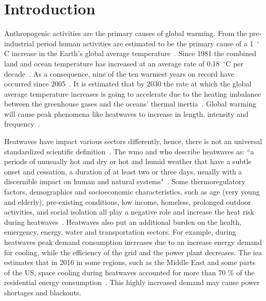 
\section{Introduction}\label{sec:introduction}

Anthropogenic activities are the primary causes of global warming.
From the pre-industrial period human activities are estimated to be the primary cause of a 1~$^{\circ}$C increase in the Earth's global average temperature~\cite{GlobalWa91:online}.
Since 1981 the combined land and ocean temperature has increased at an average rate of 0.18~$^{\circ}$C per decade~\cite{GlobalCl28:online}.
As a consequence, nine of the ten warmest years on record have occurred since 2005~\cite{ClimateC26:online}.
It is estimated that by 2030 the rate at which the global average temperature increases is going to accelerate due to the heating imbalance between the greenhouse gases and the oceans' thermal inertia~\cite{ClimateC26:online}.
Global warming will cause peak phenomena like heatwaves to increase in length, intensity and frequency~\cite{Whatharm75:online}.

Heatwaves have impact various sectors differently, hence, there is not an universal standardized scientific definition~\cite{Perkins2013}.
The \ac{wmo} and \ac{who} describe heatwaves as: ``a periods of unusually hot and dry or hot and humid weather that have a subtle onset and cessation, a duration of at least two or three days, usually with a discernible impact on human and natural systems"~\cite{WMO2015}.
Some thermoregulatory factors, demographics and socioeconomic characteristics, such as age (very young and elderly), pre-existing conditions, low income, homeless, prolonged outdoor activities, and social isolation all play a negative role and increase the heat risk during heatwaves~\cite{WMO2015}.
Heatwaves also put an additional burden on the health, emergency, energy, water and transportation sectors.
For example, during heatwaves peak demand consumption increases due to an increase energy demand for cooling, while the efficiency of the grid and the power plant decreases.
The \ac{iea} estimates that in 2016 in some regions, such as the Middle East and some parts of the US, space cooling during heatwaves accounted for more than 70 \% of the residential energy consumption~\cite{IEA2018}.
This highly increased demand may cause power shortages and blackouts.

